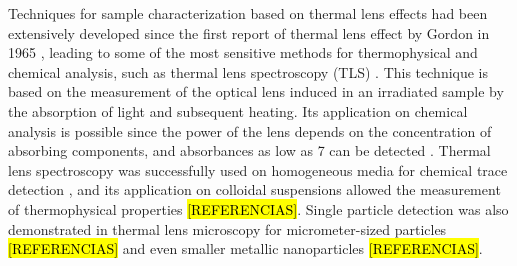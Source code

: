 \documentclass[9pt,twocolumn,twoside]{osajnl}
\begin{document}
Techniques for sample characterization based on thermal lens effects had been extensively developed since the first report of thermal lens effect by Gordon in 1965 \cite{Gordon1965}, leading to some of the most sensitive methods for thermophysical and chemical analysis, such as thermal lens spectroscopy (TLS) \cite{Franko2010,Liu2016}. This technique is based on the measurement of the optical lens induced in an irradiated sample by the absorption of light and subsequent heating. Its application on chemical analysis is possible since the power of the lens depends on the concentration of absorbing components, and absorbances as low as \SI{7}{\arb} can be detected \cite{Proskurnin2015}. Thermal lens spectroscopy was successfully used on homogeneous media for chemical trace detection \cite{Sikovec1996,Franko2010}, and its application on colloidal suspensions allowed the measurement of thermophysical properties \hl{[REFERENCIAS]}. Single particle detection was also demonstrated in thermal lens microscopy for micrometer-sized particles \hl{[REFERENCIAS]} and even smaller metallic nanoparticles \hl{[REFERENCIAS]}.
\end{document}
